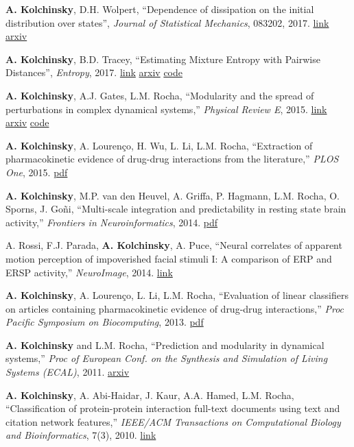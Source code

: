 \textbf{A. Kolchinsky}, D.H. Wolpert, ``Dependence of dissipation on the initial distribution over states'',
\emph{Journal of Statistical Mechanics}, 083202, 2017. 
\href{http://dx.doi.org/10.1088/1742-5468/aa7ee1}{link}
\href{https://arxiv.org/abs/1607.00956}{arxiv}

\textbf{A. Kolchinsky}, B.D. Tracey, ``Estimating Mixture Entropy with Pairwise Distances'', \emph{Entropy}, 2017.
\href{http://www.mdpi.com/1099-4300/19/7/361}{link}
\href{https://arxiv.org/abs/1706.02419}{arxiv}
\href{https://github.com/btracey/mixent/}{code}

\textbf{A. Kolchinsky}, A.J. Gates, L.M. Rocha, ``Modularity and
the spread of perturbations in complex dynamical systems,'' \emph{Physical Review E}, 2015. \href{https://journals.aps.org/pre/abstract/10.1103/PhysRevE.92.060801}{link} 
\href{http://arxiv.org/abs/1509.04386}{arxiv} 
\href{https://github.com/artemyk/perturbationmodularity/}{code}

\textbf{A. Kolchinsky}, A. Lourenço, H. Wu, L. Li, L.M. Rocha,
``Extraction of pharmacokinetic evidence of drug-drug interactions
from the literature,'' \emph{PLOS One}, 2015. 
\href{http://www.plosone.org/article/fetchObject.action?uri=info:doi/10.1371/journal.pone.0122199&representation=PDF}{pdf}

\textbf{A. Kolchinsky}, M.P. van den Heuvel, A. Griffa, P. Hagmann, L.M. Rocha, O. Sporns, J. Goñi, ``Multi-scale
integration and predictability in resting state brain activity,'' 
\emph{Frontiers in Neuroinformatics}, 2014. 
\href{http://journal.frontiersin.org/article/10.3389/fninf.2014.00066/pdf}{pdf}

A. Rossi, F.J. Parada, \textbf{A. Kolchinsky}, A. Puce, ``Neural correlates of apparent motion perception of impoverished facial stimuli I: A comparison of ERP and ERSP activity,'' \emph{NeuroImage}, 2014. 
\href{http://www.ncbi.nlm.nih.gov/pubmed/24736174}{link}

\textbf{A. Kolchinsky}, A. Lourenço, L. Li, L.M. Rocha, ``Evaluation of linear classifiers on articles containing pharmacokinetic evidence of drug-drug interactions,'' \emph{Proc Pacific Symposium on Biocomputing}, 2013. 
\href{http://www.informatics.indiana.edu/rocha/ps/PSB2013.pdf}{pdf}

\textbf{A. Kolchinsky} and L.M. Rocha, ``Prediction and modularity in dynamical systems,'' \emph{Proc
of European Conf. on the Synthesis and Simulation of Living Systems (ECAL)}, 2011. 
\href{http://arxiv.org/abs/1106.3703}{arxiv}

\textbf{A. Kolchinsky}, A. Abi-Haidar, J. Kaur, A.A. Hamed, L.M. Rocha, ``Classification of protein-protein interaction full-text documents using text and citation network features,'' \emph{IEEE/ACM Transactions on Computational Biology and Bioinformatics}, 7(3), 2010. 
\href{https://www.computer.org/csdl/journal/tb/2010/03/ttb2010030400/13rRUILtJpu}{link}


